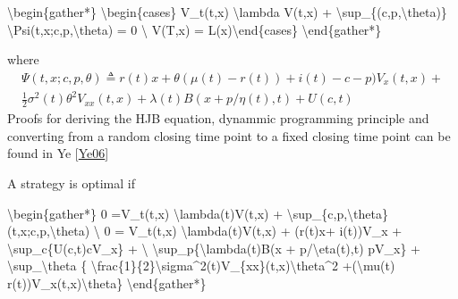 \documentclass[letterpaper,10pt,english]{jupyterBook}
\begin{document}
\sphinxAtStartPar
\textbackslash{}begin\{gather*\}
\textbackslash{}begin\{cases\}
V\_t(t,x) \sphinxhyphen{}\textbackslash{}lambda V(t,x) + \textbackslash{}sup\_\{(c,p,\textbackslash{}theta)\} \textbackslash{}Psi(t,x;c,p,\textbackslash{}theta)  = 0 \textbackslash{} V(T,x) = L(x)\textbackslash{}end\{cases\}
\textbackslash{}end\{gather*\}

\sphinxAtStartPar
where
\begin{equation*}
\begin{split} \Psi(t,x; c,p,\theta) \triangleq r(t)x + \theta(\mu(t) -r(t)) + i(t) -c -p)V_x(t,x) + \\ \frac{1}{2}\sigma^2(t)\theta^2V_{xx}(t,x) + \lambda(t)B(x+ p/\eta(t),t) + U(c,t) \end{split}
\end{equation*}
\sphinxAtStartPar
Proofs for deriving the HJB equation, dynammic programming principle and converting from a random closing time point to a fixed closing time point can be found in Ye {[}\hyperlink{cite.Financial_application:id24}{Ye06}{]}

\sphinxAtStartPar
A strategy is optimal if

\sphinxAtStartPar
\textbackslash{}begin\{gather*\}
0 =V\_t(t,x) \sphinxhyphen{}\textbackslash{}lambda(t)V(t,x) + \textbackslash{}sup\_\{c,p,\textbackslash{}theta\}(t,x;c,p,\textbackslash{}theta)  \textbackslash{}
0 = V\_t(t,x) \sphinxhyphen{}\textbackslash{}lambda(t)V(t,x) + (r(t)x+ i(t))V\_x + \textbackslash{}sup\_c\{U(c,t)\sphinxhyphen{}cV\_x\} + \textbackslash{} \textbackslash{}sup\_p\{\textbackslash{}lambda(t)B(x + p/\textbackslash{}eta(t),t) \sphinxhyphen{} pV\_x\} + \textbackslash{}sup\_\textbackslash{}theta \{ \textbackslash{}frac\{1\}\{2\}\textbackslash{}sigma\textasciicircum{}2(t)V\_\{xx\}(t,x)\textbackslash{}theta\textasciicircum{}2 +(\textbackslash{}mu(t) \sphinxhyphen{} r(t))V\_x(t,x)\textbackslash{}theta\}
\textbackslash{}end\{gather*\}
\end{document}
